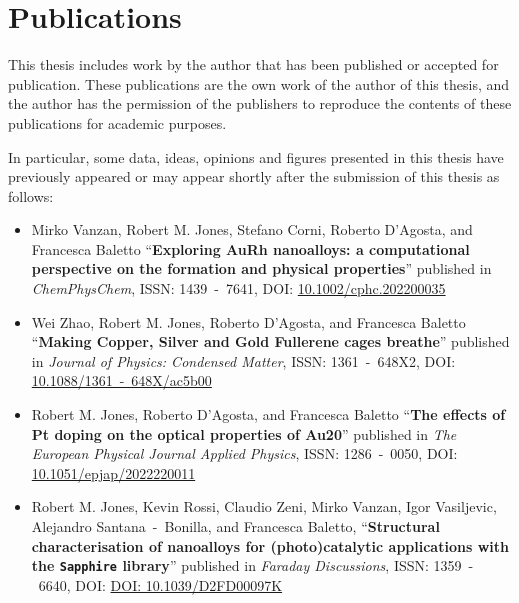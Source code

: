 \chapter*{Publications}


This thesis includes work by the author that has been published or accepted for publication. These publications are the own work of the author of this thesis, and the author has the permission of the publishers to reproduce the contents of these publications for academic purposes.

In particular, some data, ideas, opinions and figures presented in this thesis have previously appeared or may appear shortly after the submission of this thesis as follows:
\begin{itemize}
  
  \item \cite{Mirko} Mirko Vanzan, Robert M. Jones, Stefano Corni, Roberto D'Agosta, and Francesca Baletto ``\textbf{Exploring AuRh nanoalloys: a computational perspective on the formation and physical properties}'' published in \emph{ChemPhysChem}, ISSN: 1439~-~7641, DOI: \href{https://chemistry-europe.onlinelibrary.wiley.com/doi/10.1002/cphc.202200035}{10.1002/cphc.202200035}
  
  \item \cite{Wei} Wei Zhao, Robert M. Jones, Roberto D'Agosta, and Francesca Baletto ``\textbf{Making Copper, Silver and Gold Fullerene cages breathe}'' published in \emph{Journal of Physics: Condensed Matter}, ISSN: 1361~-~648X2, DOI: \href{https://iopscience.iop.org/article/10.1088/1361-648X/ac5b00}{10.1088/1361~-~648X/ac5b00}
  
  \item \cite{JonesAuPt} Robert M. Jones, Roberto D'Agosta, and Francesca Baletto ``\textbf{The effects of Pt doping on the optical properties of Au20}'' published in \emph{The European Physical Journal Applied Physics}, ISSN: 1286~-~0050, DOI: \href{https://www.epjap.org/component/article?access=doi&doi=10.1051/epjap/2022220011}{10.1051/epjap/2022220011}
  
  \item \cite{Sapphy} Robert M. Jones, Kevin Rossi, Claudio Zeni, Mirko Vanzan, Igor Vasiljevic, Alejandro
Santana~-~Bonilla, and Francesca Baletto, ``\textbf{Structural characterisation of nanoalloys for (photo)catalytic applications with the \texttt{Sapphire} library}'' published in \emph{Faraday Discussions}, ISSN: 1359~-~6640, DOI: \href{https://pubs.rsc.org/en/content/articlepdf/2022/FD/D2FD00097K?page=search}{DOI: 10.1039/D2FD00097K}
 

\end{itemize}

